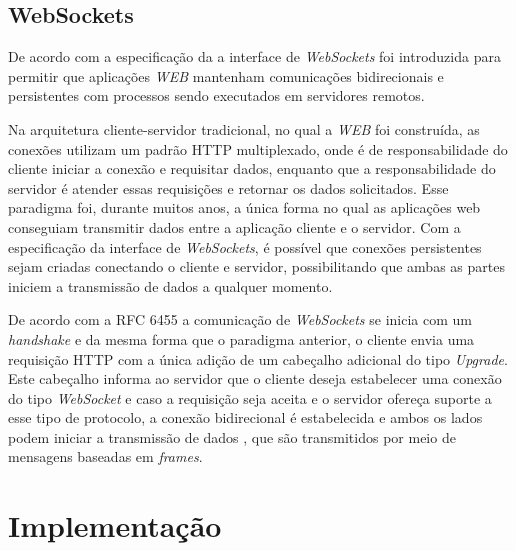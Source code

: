 \subsection{\esp WebSockets}

De acordo com a especificação da \cite{htmlStandard} a interface de \textit{WebSockets} foi introduzida para permitir que aplicações \textit{WEB} mantenham comunicações bidirecionais e persistentes com processos sendo executados em servidores remotos.

Na arquitetura cliente-servidor tradicional, no qual a \textit{WEB} foi construída, as conexões utilizam um padrão HTTP multiplexado, onde é de responsabilidade do cliente iniciar a conexão e requisitar dados, enquanto que a responsabilidade do servidor é atender essas requisições e retornar os dados solicitados. Esse paradigma foi, durante muitos anos, a única forma no qual as aplicações web conseguiam transmitir dados entre a aplicação cliente e o servidor. Com a especificação da interface de \textit{WebSockets}, é possível que conexões persistentes sejam criadas conectando o cliente e servidor, possibilitando que ambas as partes iniciem a transmissão de dados a qualquer momento.

De acordo com a RFC 6455 \cite{ieeeSE} a comunicação de \textit{WebSockets} se inicia com um \textit{handshake} e da mesma forma que o paradigma anterior, o cliente envia uma requisição HTTP com a única adição de um cabeçalho adicional do tipo \textit{Upgrade}. Este cabeçalho informa ao servidor que o cliente deseja estabelecer uma conexão do tipo \textit{WebSocket} e caso a requisição seja aceita e o servidor ofereça suporte a esse tipo de protocolo, a conexão bidirecional é estabelecida e ambos os lados podem iniciar a transmissão de dados , que são transmitidos por meio de mensagens baseadas em \textit{frames}.


\section{\esp Implementação}

